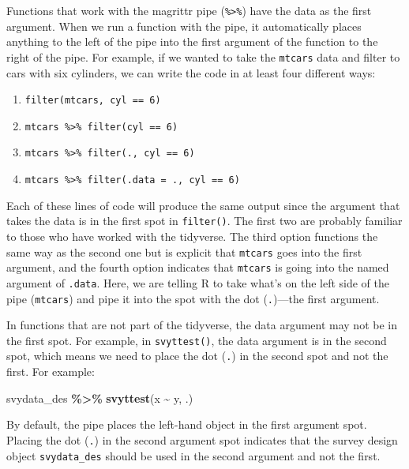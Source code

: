 \documentclass[
]{krantz}
\makeatletter
\newenvironment{Shaded}{\begin{snugshade}}{\end{snugshade}}
\newcommand{\FunctionTok}[1]{\textcolor[rgb]{0.27,0.27,0.27}{\textbf{#1}}}
\newcommand{\NormalTok}[1]{#1}
\newcommand{\SpecialCharTok}[1]{\textcolor[rgb]{0.43,0.43,0.43}{\textbf{#1}}}
\providecommand{\tightlist}{%
  \setlength{\itemsep}{0pt}\setlength{\parskip}{0pt}}
\newenvironment{kframe}{%
\medskip{}
\setlength{\fboxsep}{.8em}
 \def\at@end@of@kframe{}%
 \ifinner\ifhmode%
  \def\at@end@of@kframe{\end{minipage}}%
  \begin{minipage}{\columnwidth}%
 \fi\fi%
 \def\FrameCommand##1{\hskip\@totalleftmargin \hskip-\fboxsep
 \colorbox{shadecolor}{##1}\hskip-\fboxsep
     \hskip-\linewidth \hskip-\@totalleftmargin \hskip\columnwidth}%
 \MakeFramed {\advance\hsize-\width
   \@totalleftmargin\z@ \linewidth\hsize
   \@setminipage}}%
 {\par\unskip\endMakeFramed%
 \at@end@of@kframe}
\renewenvironment{Shaded}{\begin{kframe}}{\end{kframe}}
\makeatother
\begin{document}
Functions that work with the magrittr pipe (\texttt{\%\textgreater{}\%}) have the data as the first argument. When we run a function with the pipe, it automatically places anything to the left of the pipe into the first argument of the function to the right of the pipe. For example, if we wanted to take the \texttt{mtcars} data and filter to cars with six cylinders, we can write the code in at least four different ways:

\begin{enumerate}
\def\labelenumi{\arabic{enumi}.}
\tightlist
\item
  \texttt{filter(mtcars,\ cyl\ ==\ 6)}
\item
  \texttt{mtcars\ \%\textgreater{}\%\ filter(cyl\ ==\ 6)}
\item
  \texttt{mtcars\ \%\textgreater{}\%\ filter(.,\ cyl\ ==\ 6)}
\item
  \texttt{mtcars\ \%\textgreater{}\%\ filter(.data\ =\ .,\ cyl\ ==\ 6)}
\end{enumerate}

Each of these lines of code will produce the same output since the argument that takes the data is in the first spot in \texttt{filter()}. The first two are probably familiar to those who have worked with the tidyverse. The third option functions the same way as the second one but is explicit that \texttt{mtcars} goes into the first argument, and the fourth option indicates that \texttt{mtcars} is going into the named argument of \texttt{.data}. Here, we are telling R to take what's on the left side of the pipe (\texttt{mtcars}) and pipe it into the spot with the dot (\texttt{.})---the first argument.

In functions that are not part of the tidyverse, the data argument may not be in the first spot. For example, in \texttt{svyttest()}, the data argument is in the second spot, which means we need to place the dot (\texttt{.}) in the second spot and not the first. For example:

\begin{Shaded}
\begin{Highlighting}[]
\NormalTok{svydata\_des }\SpecialCharTok{\%\textgreater{}\%}
 \FunctionTok{svyttest}\NormalTok{(x }\SpecialCharTok{\textasciitilde{}}\NormalTok{ y, .)}
\end{Highlighting}
\end{Shaded}

By default, the pipe places the left-hand object in the first argument spot. Placing the dot (\texttt{.}) in the second argument spot indicates that the survey design object \texttt{svydata\_des} should be used in the second argument and not the first.
\end{document}
